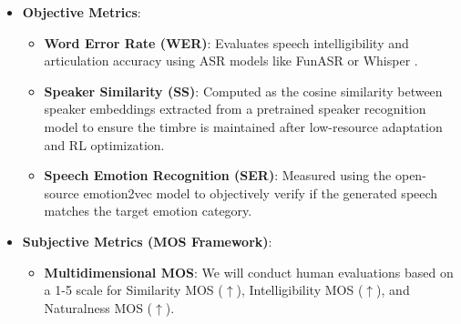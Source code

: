 \begin{itemize}
    \item \textbf{Objective Metrics}:
    \begin{itemize}
        \item \textbf{Word Error Rate (WER)}: Evaluates speech intelligibility and articulation accuracy using ASR models like FunASR \citep{2025arXiv250912508A} or Whisper \citep{Radford2022RobustSR}.
        \item \textbf{Speaker Similarity (SS)}: Computed as the cosine similarity between speaker embeddings extracted from a pretrained speaker recognition model to ensure the timbre is maintained after low-resource adaptation and RL optimization.
        \item \textbf{Speech Emotion Recognition (SER)}: Measured using the open-source emotion2vec model to objectively verify if the generated speech matches the target emotion category.
    \end{itemize}
    \item \textbf{Subjective Metrics (MOS Framework)}:
    \begin{itemize}
        \item \textbf{Multidimensional MOS}: We will conduct human evaluations based on a 1-5 scale for Similarity MOS ($\uparrow$), Intelligibility MOS ($\uparrow$), and Naturalness MOS ($\uparrow$).
    \end{itemize}
\end{itemize}

